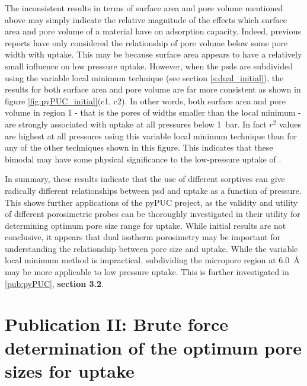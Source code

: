 The inconsistent results in terms of surface area and pore volume mentioned above may simply indicate the relative magnitude of the effects which surface area and pore volume of a material have on \gls{adsorption} capacity. Indeed, previous reports have only considered the relationship of pore volume below some pore width with  uptake.\citep{Presser2011Effect, Sevilla2013Assessment, Adeniran2016Is, Wickramaratne2013Importance} This may be because surface area appears to have a relatively small influence on low pressure  uptake\citep{Sevilla2021More, Ludwinowicz2015Effect, Singh2019CO2, GrauMarin2020Evaluation}. However, when the \glspl{psd} are subdivided using the variable local minimum technique (see section \ref{s:dual_initial}), the results for both surface area and pore volume are far more consistent as shown in figure \ref{fig:pyPUC_initial}(c1, c2). In other words, both surface area and pore volume in region 1 - that is the pores of widths smaller than the local minimum - are strongly associated with  uptake at all pressures below \qty{1}{\bar}. In fact $r^2$ values are highest at all pressures using this variable local minimum technique than for any of the other techniques shown in this figure. This indicates that these bimodal  may have some physical significance to the low-pressure uptake of .

In summary, these results indicate that the use of different sorptives can give radically different relationships between \gls{psd} and  uptake as a function of pressure. This shows further applications of the pyPUC project, as the validity and utility of different porosimetric probes can be thoroughly investigated in their utility for determining optimum pore size range for  uptake. While initial results are not conclusive, it appears that dual isotherm porosimetry may be important for understanding the relationship between pore size and  uptake. While the variable local minimum method is impractical, subdividing the \gls{micropore} region at \qty{6.0}{\angstrom} may be more applicable to low pressure  uptake. This is further investigated in \ref{pub:pyPUC}, \textbf{section 3.2}.

\newpage
\section[Publication II]{\texorpdfstring{Publication II: Brute force determination of the optimum pore sizes for
 uptake}{Publication III: Brute force determination of the optimum pore sizes for
CO2 uptake}}

